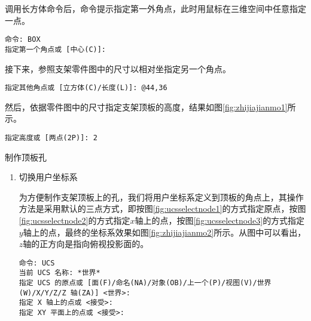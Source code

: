\begin{procedure}
调用长方体命令后，命令提示指定第一外角点，此时用鼠标在三维空间中任意指定一点。
\begin{lstlisting}
命令: BOX
指定第一个角点或 [中心(C)]:
\end{lstlisting}

接下来，参照支架零件图中的尺寸以相对坐指定另一个角点。
\begin{lstlisting}
指定其他角点或 [立方体(C)/长度(L)]: @44,36
\end{lstlisting}

然后，依据零件图中的尺寸指定支架顶板的高度，结果如图\ref{fig:zhijiajianmo1}所示。

\begin{lstlisting}
指定高度或 [两点(2P)]: 2
\end{lstlisting}

\begin{figure}[htbp]
\centering
\begin{floatrow}[2]
\end{floatrow}
\end{figure}

\item 制作顶板孔

\begin{enumerate}
\item 切换用户坐标系

为方便制作支架顶板上的孔，我们将用户坐标系定义到顶板的角点上，其操作方法是采用默认的三点方式，即按图\ref{fig:ucsselectnode1}的方式指定原点，按图\ref{fig:ucsselectnode2}的方式指定$x$轴上的点，按图\ref{fig:ucsselectnode3}的方式指定$y$轴上的点，最终的坐标系效果如图\ref{fig:zhijiajianmo2}所示。从图中可以看出，$z$轴的正方向是指向俯视投影面的。


\begin{lstlisting}
命令: UCS
当前 UCS 名称: *世界*
指定 UCS 的原点或 [面(F)/命名(NA)/对象(OB)/上一个(P)/视图(V)/世界(W)/X/Y/Z/Z 轴(ZA)] <世界>:
指定 X 轴上的点或 <接受>:
指定 XY 平面上的点或 <接受>:
\end{lstlisting}



\end{enumerate}
\end{procedure}
